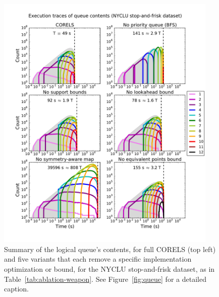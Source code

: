 \begin{figure}[t!]
\begin{center}
\includegraphics[trim={15mm 20mm 5mm 25mm},
width=0.94\textwidth]{figs/weapon_ablation-queue.pdf}
\end{center}
\vspace{-5mm}
\caption{Summary of the logical queue's contents, for full CORELS (top left)
and five variants that each remove a specific implementation optimization or bound,
for the NYCLU stop-and-frisk dataset, as in Table~\ref{tab:ablation-weapon}.
%
See Figure~\ref{fig:queue} for a detailed caption.
}
\label{fig:queue-weapon}
\end{figure}

